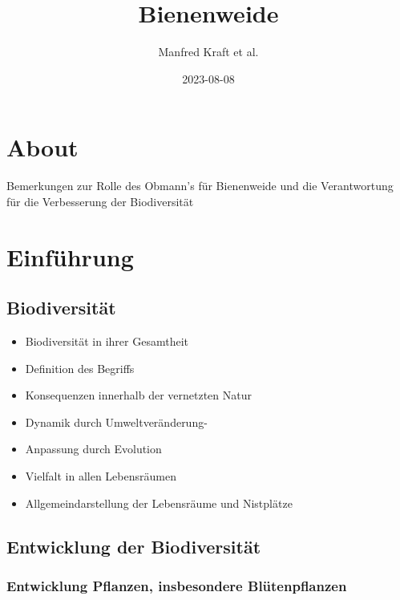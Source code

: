 \documentclass[
]{book}
\title{Bienenweide}
\author{Manfred Kraft et al.}
\date{2023-08-08}
\providecommand{\tightlist}{%
  \setlength{\itemsep}{0pt}\setlength{\parskip}{0pt}}
\begin{document}
\maketitle

{
\setcounter{tocdepth}{1}
\tableofcontents
}
\hypertarget{about}{%
\chapter{About}\label{about}}

Bemerkungen zur Rolle des Obmann's für Bienenweide
und die Verantwortung für die Verbesserung der Biodiversität

\hypertarget{einfuxfchrung}{%
\chapter{Einführung}\label{einfuxfchrung}}

\hypertarget{biodiversituxe4t}{%
\section{Biodiversität}\label{biodiversituxe4t}}

\begin{itemize}
\tightlist
\item
  Biodiversität in ihrer Gesamtheit
\item
  Definition des Begriffs
\item
  Konsequenzen innerhalb der vernetzten Natur
\item
  Dynamik durch Umweltveränderung-
\item
  Anpassung durch Evolution
\item
  Vielfalt in allen Lebensräumen
\item
  Allgemeindarstellung der Lebensräume und Nistplätze
\end{itemize}

\hypertarget{entwicklung-der-biodiversituxe4t}{%
\section{Entwicklung der Biodiversität}\label{entwicklung-der-biodiversituxe4t}}

\hypertarget{entwicklung-pflanzen-insbesondere-bluxfctenpflanzen}{%
\subsection{Entwicklung Pflanzen, insbesondere Blütenpflanzen}\label{entwicklung-pflanzen-insbesondere-bluxfctenpflanzen}}
\end{document}
